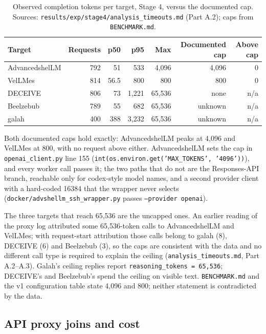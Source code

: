\documentclass[a4paper,11pt]{article}
\begin{document}
\begin{table}[ht]
\centering
\caption{Observed completion tokens per target, Stage 4, versus the documented
cap. Sources: \texttt{results/exp/stage4/analysis\_timeouts.md} (Part A.2);
caps from \texttt{BENCHMARK.md}.}
\label{tab:maxtokens}
\scriptsize
\begin{tabular}{l r r r r r r}
\toprule
Target & Requests & p50 & p95 & Max & Documented cap & Above cap \\
\midrule
AdvancedshelLM & 792 & 51 & 533 & 4,096 & 4,096 & 0 \\
VelLMes & 814 & 56.5 & 800 & 800 & 800 & 0 \\
DECEIVE & 806 & 73 & 1,221 & 65,536 & none & n/a \\
Beelzebub & 789 & 55 & 682 & 65,536 & unknown & n/a \\
galah & 400 & 388 & 3,232 & 65,536 & unknown & n/a \\
\bottomrule
\end{tabular}
\end{table}

Both documented caps hold exactly: AdvancedshelLM peaks at 4,096 and VelLMes at
800, with no request above either. AdvancedshelLM sets the cap in
\texttt{openai\_client.py} line 155 (\texttt{int(os.environ.get('MAX\_TOKENS',
'4096'))}), and every worker call passes it; the two paths that do not are the
Responses-API branch, reachable only for codex-style model names, and a
second provider client with a hard-coded 16384 that the wrapper never selects
(\texttt{docker/advshellm\_ssh\_wrapper.py} passes \texttt{--provider openai}).

The three targets that reach 65,536 are the uncapped ones. An earlier reading
of the proxy log attributed some 65,536-token calls to AdvancedshelLM and
VelLMes; with request-start attribution those calls belong to galah (8),
DECEIVE (6) and Beelzebub (3), so the caps are consistent with the data and no
different call type is required to explain the ceiling
(\texttt{analysis\_timeouts.md}, Part A.2--A.3). Galah's ceiling replies report
\texttt{reasoning\_tokens = 65,536}; DECEIVE's and Beelzebub's spend the ceiling
on visible text. \texttt{BENCHMARK.md} and the v1 configuration table state
4,096 and 800; neither statement is contradicted by the data.

\subsection{API proxy joins and cost}
\label{sec:s4-cost}
\end{document}
